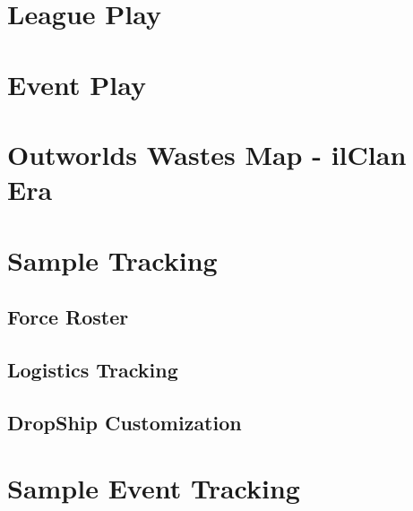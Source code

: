 \documentclass{article}
\newcommand{\mysectiontitle}{}
\newcommand{\newsection}[2]{\renewcommand{\mysectiontitle}{#2}\section{#1}}
\begin{document}


\newpage

\newsection{League Play}{league-play}
\label{sec:league_play}



\newpage

\newsection{Event Play}{event-play}
\label{sec:event_play}



\newpage

\newsection{Outworlds Wastes Map - ilClan Era}{outworlds-wastes-map}
\label{sec:outworlds_wastes_map}



\newpage

\newsection{Sample Tracking}{sample-tracking}
\label{sec:sample_tracking}

\subsection{Force Roster}



\subsection{Logistics Tracking}



\subsection{DropShip Customization}



\newpage

\newsection{Sample Event Tracking}{sample-tracking-event}
\label{sec:sample_tracking_event}
\end{document}

